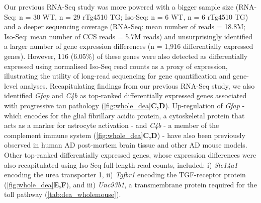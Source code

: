Our previous RNA-Seq study\cite{Castanho2020} was more powered with a bigger sample size (RNA-Seq: n = 30 WT, n = 29 rTg4510 TG; Iso-Seq: n = 6 WT, n = 6 rTg4510 TG) and a deeper sequencing coverage (RNA-Seq: mean number of reads = 18.8M; Iso-Seq: mean number of CCS reads = 5.7M reads) and unsurprisingly identified a larger number of gene expression differences (n = 1,916 differentially expressed genes). However, 116 (6.05\%) of these genes were also detected as differentially expressed using normalised Iso-Seq read counts as a proxy of expression, illustrating the utility of long-read sequencing for gene quantification and gene-level analyses. Recapitulating findings from our previous RNA-Seq study, we also identified \textit{Gfap} and \textit{C4b} as top-ranked differentially expressed genes associated with progressive tau pathology (\cref{fig:whole_dea}\textbf{C,D}). Up-regulation of \textit{Gfap} - which encodes for the glial fibrillary acidic protein, a cytoskeletal protein that acts as a marker for astrocyte activation - and \textit{C4b} - a member of the complement immune system (\cref{fig:whole_dea}\textbf{C,D}) - have also been previously observed in human AD post-mortem brain tissue and other AD mouse models\cite{Muramori1998,Ishiki2016, Chatterjee2021}. Other top-ranked differentially expressed genes, whose expression differences were also recapitulated using Iso-Seq full-length read counts, included: i) \textit{Slc14a1}\cite{Castillo2017} encoding the urea transporter 1, ii) \textit{Tgfbr1} encoding the TGF-\textbeta receptor protein (\cref{fig:whole_dea}\textbf{E,F}), and iii) \textit{Unc93b1}\cite{Wirz2013}, a transmembrane protein required for the toll pathway (\cref{tab:dea_wholemouse}).

